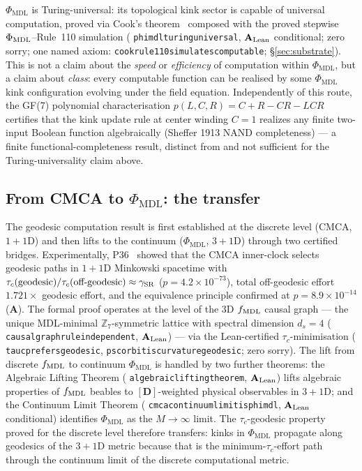 \documentclass[11pt]{article}
\theoremstyle{remark}
\newcommand{\PHIMDL}{\Phi_{\mathrm{MDL}}}
\newcommand{\ZS}{\mathbb{Z}_7}
\newcommand{\lean}[1]{%
  \penalty-100
  \begingroup\def\_{\textunderscore\allowbreak}\texttt{#1}\endgroup}
\newcommand{\CatA}{\textbf{A}}
\newcommand{\CatAL}{\ensuremath{\textbf{A}_{\rm Lean}}}
\begin{document}
$\PHIMDL$ is Turing-universal: its topological kink sector is capable of universal
computation, proved via Cook's theorem~\cite{Cook2004} composed with the proved
stepwise $\Phi_{\rm MDL}$--Rule~110 simulation
(\lean{phimdl\_turing\_universal}, $\CatAL$ conditional; zero sorry; one named axiom:
\lean{cook\_rule110\_simulates\_computable}; \S\ref{sec:substrate}).
This is not a claim about the \emph{speed} or \emph{efficiency} of computation
within $\PHIMDL$, but a claim about \emph{class}: every computable function can
be realised by some $\PHIMDL$ kink configuration evolving under the field equation.
Independently of this route, the GF(7) polynomial characterisation
$p(L,C,R) = C+R-CR-LCR$~\cite{SpivackGF7Universality,SpivackCMCA} certifies that the
kink update rule at center winding $C=1$ realizes any finite two-input Boolean function
algebraically (Sheffer 1913 NAND completeness) --- a finite functional-completeness
result, distinct from and not sufficient for the Turing-universality claim above.

\subsection{From CMCA to \texorpdfstring{$\PHIMDL$}{Phi-MDL}: the transfer}

The geodesic computation result is first established at the discrete level (CMCA,
$1+1$D) and then lifts to the continuum ($\PHIMDL$, $3+1$D) through two certified bridges.
Experimentally, P36~\cite{SpivackEmergentGravity} showed that the CMCA inner-clock
selects geodesic paths in $1+1$D Minkowski spacetime with
$\tau_c(\text{geodesic})/\tau_c(\text{off-geodesic})\approx\gamma_{\rm SR}$
($p=4.2\times10^{-73}$), total off-geodesic effort $1.721\times$ geodesic effort,
and the equivalence principle confirmed at $p=8.9\times10^{-14}$ ($\CatA$).
The formal proof operates at the level of the 3D $f_{\rm MDL}$ causal graph ---
the unique MDL-minimal $\ZS$-symmetric lattice with spectral dimension $d_s=4$
(\lean{causal\_graph\_rule\_independent}, $\CatAL$) --- via the
Lean-certified $\tau_c$-minimisation (\lean{tau\_c\_prefers\_geodesic},
\lean{psc\_orbit\_is\_curvature\_geodesic}; zero sorry).  The lift from discrete
$f_{\rm MDL}$ to continuum $\PHIMDL$ is handled by two further theorems: the
Algebraic Lifting Theorem (\lean{algebraic\_lifting\_theorem}, $\CatAL$)
lifts algebraic properties of $f_{\rm MDL}$ beables to $[\mathbf{D}]$-weighted
physical observables in $3+1$D; and the Continuum Limit Theorem
(\lean{cmca\_continuum\_limit\_is\_phimdl}, $\CatAL$ conditional) identifies
$\PHIMDL$ as the $M\to\infty$ limit.  The $\tau_c$-geodesic property proved for the
discrete level therefore transfers: kinks in $\PHIMDL$ propagate along geodesics of
the $3+1$D metric because that is the minimum-$\tau_c$-effort path through the
continuum limit of the discrete computational metric.
\end{document}
